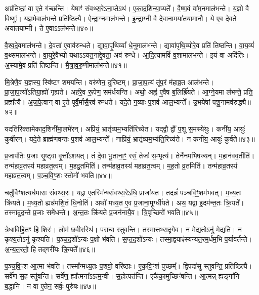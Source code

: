 अप्र॑तिष्ठां॒ वा ए॒ते ग॑च्छन्ति।
येषाꣳ॑ संवथ्स॒रे\-ऽना॒प्तेऽथ॑।
ए॒का॒द॒शिन्या॒प्यते᳚।
वै॒ष्ण॒वं वा॑म॒नमाल॑भन्ते।
य॒ज्ञो वै विष्णुः॑।
य॒ज्ञमे॒वाल॑भन्ते॒ प्रति॑\-ष्ठित्यै।
ऐ॒न्द्रा॒ग्नमाल॑भन्ते।
इ॒न्द्रा॒ग्नी वै दे॒वाना॒मया॑तयामानौ।
ये ए॒व दे॒वते॒ अया॑तयाम्नी।
ते ए॒वाऽऽल॑भन्ते॥४०॥

वै॒श्व॒दे॒वमाल॑भन्ते।
दे॒वता॑ ए॒वाव॑रुन्धते।
द्या॒वा॒पृ॒थिव्यां᳚ धे॒नुमाल॑भन्ते।
द्यावा॑पृथि॒व्योरे॒व प्रति॑ तिष्ठन्ति।
वा॒य॒व्यं॑ व॒थ्समाल॑भन्ते।
वा॒युरे॒वैभ्यो॑ यथा\-ऽऽयत॒नाद्दे॒वता॒ अव॑ रुन्धे।
आ॒दि॒त्यामविं॑ व॒शामाल॑भन्ते।
इ॒यं वा अदि॑तिः।
अ॒स्यामे॒व प्रति॑ तिष्ठन्ति।
मै॒त्रा॒व॒रु॒णीमाल॑भन्ते॥४१॥

मि॒त्रेणै॒व य॒ज्ञस्य॒ स्वि॑ष्टꣳ शमयन्ति।
वरु॑णेन॒ दुरि॑ष्टम्।
प्रा॒जा॒प॒त्यं तू॑प॒रं म॑हाव्र॒त आल॑भन्ते।
प्रा॒जा॒प॒त्यो॑\-ऽतिग्रा॒ह्यो॑ गृह्यते।
अह॑रे॒व रू॒पेण॒ सम॑र्धयन्ति।
अथो॒ अह्न॑ ए॒वैष ब॒लिर्\mbox{}ह्रि॑यते।
आ॒ग्ने॒यमा ल॑भन्ते॒ प्रति॒ प्रज्ञा᳚त्यै।
अ॒ज॒पे॒त्वान् वा ए॒ते पूर्वै॒र्मासै॒रव॑ रुन्धते।
यदे॒ते ग॒व्याः प॒शव॑ आल॒भ्यन्ते᳚।
उ॒भये॑षां पशू॒नामव॑रुद्ध्यै॥४२॥

यदति॑रिक्तामेकाद॒शिनी॑मा॒लभे॑रन्।
अप्रि॑यं॒ भ्रातृ॑व्यम॒भ्यति॑\-रिच्येत।
यद्द्वौ द्वौ॑ प॒शू स॒मस्ये॑युः।
कनी॑य॒ आयुः॑ कुर्वीरन्।
यदे॒ते ब्राह्म॑णवन्तः प॒शव॑ आल॒भ्यन्ते᳚।
नाप्रि॑यं॒ भ्रातृ॑व्यम॒भ्य॑ति॒\-रिच्य॑ते।
न कनी॑य॒ आयुः॑ कुर्वते॥४३॥\anuvakamend[ते ए॒वाल॑भन्ते मैत्रावरु॒णीमाल॑भ॒न्ते\-ऽव॑रुद्ध्यै स॒प्त च॑]

प्र॒जा\-प॑तिः प्र॒जाः सृ॒ष्ट्वा वृ॒त्तो॑\-ऽशयत्।
तं दे॒वा भू॒ताना॒ꣳ॒ रसं॒ तेजः॑ स॒म्भृत्य॑।
तेनै॑नमभिषज्यन्।
म॒हान॑वव॒र्तीति॑।
तन्म॑हाव्र॒तस्य॑ महाव्रत॒त्वम्।
म॒हद्व्र॒तमिति॑।
तन्म॑हाव्र॒तस्य॑ महाव्रत॒त्वम्।
म॒ह॒तो व्र॒तमिति॑।
तन्म॑हाव्र॒तस्य॑ महाव्रत॒त्वम्।
प॒ञ्च॒वि॒ꣳ॒शः स्तोमो॑ भवति॥४४॥

चतु॑र्विꣳशत्यर्धमासः संवथ्स॒रः।
यद्वा ए॒तस्मि᳚न्थ्संवथ्स॒रेऽधि॒ प्राजा॑यत।
तदन्नं॑ पञ्चवि॒ꣳ॒शम॑भवत्।
म॒ध्य॒तः क्रि॑यते।
म॒ध्य॒तो ह्यन्न॑मशि॒तं धि॒नोति॑।
अथो॑ मध्य॒त ए॒व प्र॒जाना॒मूर्ग्धी॑यते।
अथ॒ यद्वा इ॒दम॑न्त॒तः क्रि॒यते᳚।
तस्मा॑दुद॒न्ते प्र॒जाः समे॑धन्ते।
अ॒न्त॒तः क्रि॑यते प्र॒जन॑नायै॒व।
त्रि॒वृच्छिरो॑ भवति॥४५॥

त्रे॒धा॒वि॒हि॒तꣳ हि शिरः॑।
लोम॑ छ॒वीरस्थि॑।
परा॑चा स्तुवन्ति।
तस्मा॒त्तथ्स॒दृगे॒व।
न मेद्य॒तोऽनु॑ मेद्यति।
न कृश्य॒तोऽनु॑ कृश्यति।
प॒ञ्च॒द॒शो᳚\-ऽन्यः प॒क्षो भ॑वति।
स॒प्त॒द॒शो᳚\-ऽन्यः।
तस्मा॒द्वयाꣴ॑स्यन्यत॒रम॒र्धम॒भि प॒र्याव॑र्तन्ते।
अ॒न्य॒त॒रतो॒ हि तद्गरी॑यः क्रि॒यते᳚॥४६॥

प॒ञ्च॒वि॒ꣳ॒श आ॒त्मा भ॑वति।
तस्मा᳚न्मध्य॒तः प॒शवो॒ वरि॑ष्ठाः।
ए॒क॒वि॒ꣳ॒शं पुच्छम्᳚।
द्वि॒पदा॑सु स्तुवन्ति॒ प्रति॑\-ष्ठित्यै।
सर्वे॑ण स॒ह स्तु॑वन्ति।
सर्वे॑ण॒ ह्या᳚त्मना᳚\-ऽऽत्म॒न्वी।
स॒होत्पत॑न्ति।
एकै॑का॒मुच्छिꣳ॑षन्ति।
आ॒त्मन्न् ह्यङ्गा॑नि ब॒द्धानि॑।
न वा ए॒तेन॒ सर्वः॒ पुरु॑षः॥४७॥


